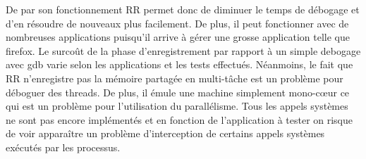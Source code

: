 De par son fonctionnement RR permet donc de diminuer le temps de débogage et d'en résoudre de nouveaux plus facilement. De plus, il peut fonctionner avec de nombreuses applications puisqu'il arrive à gérer une grosse application telle que firefox. Le surcoût de la phase d'enregistrement par rapport à un simple debogage avec gdb varie selon les applications et les tests effectués. Néanmoins, le fait que RR n'enregistre pas la mémoire partagée en multi-tâche est un problème pour déboguer des threads. De plus, il émule une machine simplement mono-c\oe ur ce qui est un problème pour l'utilisation du parallélisme. Tous les appels systèmes ne sont pas encore implémentés et en fonction de l'application à tester on risque de voir apparaître un problème d'interception de certains appels systèmes exécutés par les processus.
